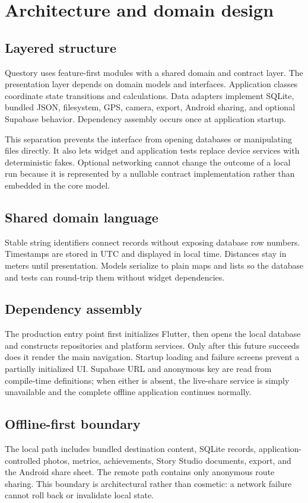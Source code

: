 \section{Architecture and domain design}

\subsection{Layered structure}
Questory uses feature-first modules with a shared domain and contract layer. The
presentation layer depends on domain models and interfaces. Application classes
coordinate state transitions and calculations. Data adapters implement SQLite,
bundled JSON, filesystem, GPS, camera, export, Android sharing, and optional
Supabase behavior. Dependency assembly occurs once at application startup.



This separation prevents the interface from opening databases or manipulating
files directly. It also lets widget and application tests replace device services
with deterministic fakes. Optional networking cannot change the outcome of a
local run because it is represented by a nullable contract implementation rather
than embedded in the core model.

\subsection{Shared domain language}


Stable string identifiers connect records without exposing database row numbers.
Timestamps are stored in UTC and displayed in local time. Distances stay in
meters until presentation. Models serialize to plain maps and lists so the
database and tests can round-trip them without widget dependencies.

\subsection{Dependency assembly}
The production entry point first initializes Flutter, then opens the local
database and constructs repositories and platform services. Only after this
future succeeds does it render the main navigation. Startup loading and failure
screens prevent a partially initialized UI. Supabase URL and anonymous key are
read from compile-time definitions; when either is absent, the live-share service
is simply unavailable and the complete offline application continues normally.

\subsection{Offline-first boundary}
The local path includes bundled destination content, SQLite records, application-
controlled photos, metrics, achievements, Story Studio documents, export, and
the Android share sheet. The remote path contains only anonymous route sharing.
This boundary is architectural rather than cosmetic: a network failure cannot
roll back or invalidate local state.


